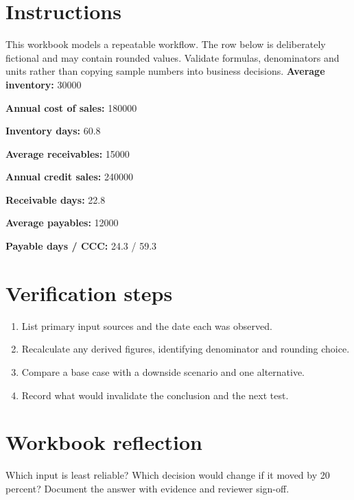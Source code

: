 \documentclass[11pt]{article}
\begin{document}
\SuiteOpen
\section{Instructions}
This workbook models a repeatable workflow. The row below is deliberately fictional and may contain rounded values. Validate formulas, denominators and units rather than copying sample numbers into business decisions.
\noindent\textbf{Average inventory:} 30000\par\medskip
\noindent\textbf{Annual cost of sales:} 180000\par\medskip
\noindent\textbf{Inventory days:} 60.8\par\medskip
\noindent\textbf{Average receivables:} 15000\par\medskip
\noindent\textbf{Annual credit sales:} 240000\par\medskip
\noindent\textbf{Receivable days:} 22.8\par\medskip
\noindent\textbf{Average payables:} 12000\par\medskip
\noindent\textbf{Payable days / CCC:} 24.3 / 59.3\par\medskip
\section{Verification steps}
\begin{enumerate}[leftmargin=*,itemsep=5pt]
\item List primary input sources and the date each was observed.
\item Recalculate any derived figures, identifying denominator and rounding choice.
\item Compare a base case with a downside scenario and one alternative.
\item Record what would invalidate the conclusion and the next test.
\end{enumerate}

\section{Workbook reflection}
Which input is least reliable? Which decision would change if it moved by 20 percent? Document the answer with evidence and reviewer sign-off.
\end{document}
